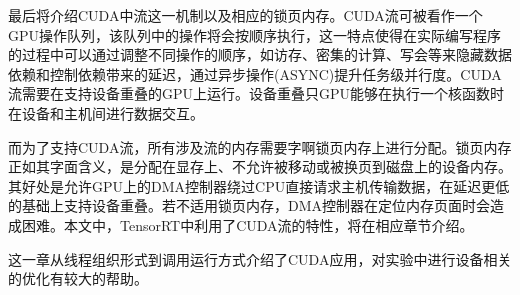 \par 最后将介绍CUDA中流这一机制以及相应的锁页内存。CUDA流可被看作一个GPU操作队列，该队列中的操作将会按顺序执行，这一特点使得在实际编写程序的过程中可以通过调整不同操作的顺序，如访存、密集的计算、写会等来隐藏数据依赖和控制依赖带来的延迟\parencite{STREAM}，通过异步操作(ASYNC)提升任务级并行度。CUDA流需要在支持设备重叠的GPU上运行。设备重叠只GPU能够在执行一个核函数时在设备和主机间进行数据交互。
\par 而为了支持CUDA流，所有涉及流的内存需要字啊锁页内存上进行分配。锁页内存正如其字面含义，是分配在显存上、不允许被移动或被换页到磁盘上的设备内存。其好处是允许GPU上的DMA控制器绕过CPU直接请求主机传输数据，在延迟更低的基础上支持设备重叠。若不适用锁页内存，DMA控制器在定位内存页面时会造成困难。本文中，TensorRT中利用了CUDA流的特性，将在相应章节介绍。
\par 这一章从线程组织形式到调用运行方式介绍了CUDA应用，对实验中进行设备相关的优化有较大的帮助。
